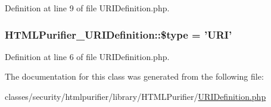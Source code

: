 Definition at line 9 of file U\+R\+I\+Definition.\+php.

\hypertarget{classHTMLPurifier__URIDefinition_af8025a26e38e2dc7f9043409d5e67646}{
\subsubsection[{\$type}]{\setlength{\rightskip}{0pt plus 5cm}H\+T\+M\+L\+Purifier\+\_\+\+U\+R\+I\+Definition\+::\$type = 'U\+R\+I'}}\label{classHTMLPurifier__URIDefinition_af8025a26e38e2dc7f9043409d5e67646}


Definition at line 6 of file U\+R\+I\+Definition.\+php.



The documentation for this class was generated from the following file\+:\begin{DoxyCompactItemize}
\item 
classes/security/htmlpurifier/library/\+H\+T\+M\+L\+Purifier/\hyperlink{URIDefinition_8php}{U\+R\+I\+Definition.\+php}\end{DoxyCompactItemize}

